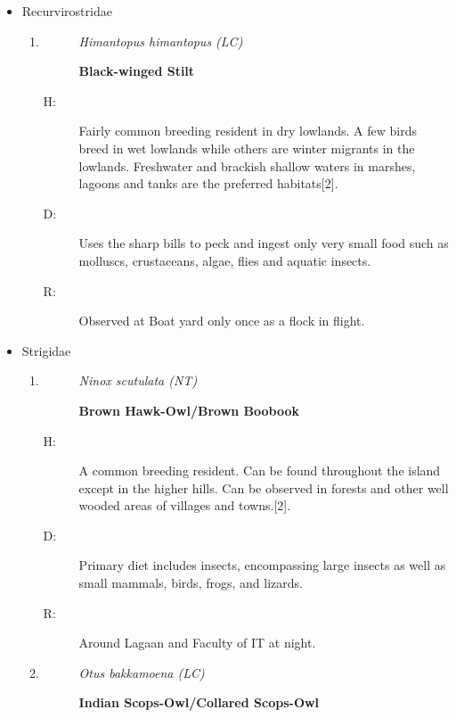 \begin{itemize}
\item%
Recurvirostridae%
\begin{enumerate}%
\item%
\begin{description}%
\item[]%
\textit{Himantopus himantopus (LC)}%
\item[]%
\textbf{Black{-}winged Stilt}%
\end{description}%
\begin{description}%
\item[H: ]%
Fairly common breeding resident in dry lowlands. A few birds breed in wet lowlands while others are winter migrants in the lowlands. Freshwater and brackish shallow waters in marshes, lagoons and tanks are the preferred habitats{[}2{]}.%
\item[D: ]%
Uses the sharp bills to peck and ingest only very small food such as molluscs, crustaceans, algae, flies and aquatic insects.%
\item[R: ]%
Observed at Boat yard only once as a flock in flight.%
\end{description}%
\end{enumerate}%
\item%
Strigidae%
\begin{enumerate}%
\item%
\begin{description}%
\item[]%
\textit{Ninox scutulata (NT)}%
\item[]%
\textbf{Brown Hawk{-}Owl/Brown Boobook}%
\end{description}%
\begin{description}%
\item[H: ]%
A common breeding resident. Can be found throughout the island except in the higher hills. Can be observed in forests and other well wooded areas of villages and towns.{[}2{]}.%
\item[D: ]%
Primary diet includes insects, encompassing large insects as well as small mammals, birds, frogs, and lizards.%
\item[R: ]%
Around Lagaan and Faculty of IT at night.%
\end{description}%
\item%
\begin{description}%
\item[]%
\textit{Otus bakkamoena (LC)}%
\item[]%
\textbf{Indian Scops{-}Owl/Collared Scops{-}Owl}%
\end{description}%

\end{enumerate}
\end{itemize}
